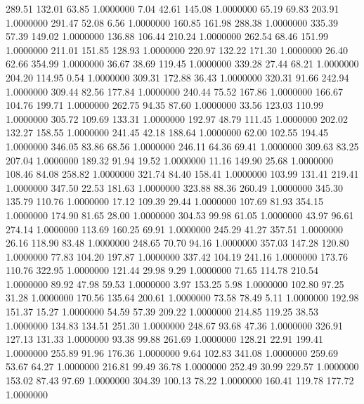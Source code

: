  289.51  132.01   63.85   1.0000000
   7.04   42.61  145.08   1.0000000
  65.19   69.83  203.91   1.0000000
 291.47   52.08    6.56   1.0000000
 160.85  161.98  288.38   1.0000000
 335.39   57.39  149.02   1.0000000
 136.88  106.44  210.24   1.0000000
 262.54   68.46  151.99   1.0000000
 211.01  151.85  128.93   1.0000000
 220.97  132.22  171.30   1.0000000
  26.40   62.66  354.99   1.0000000
  36.67   38.69  119.45   1.0000000
 339.28   27.44   68.21   1.0000000
 204.20  114.95    0.54   1.0000000
 309.31  172.88   36.43   1.0000000
 320.31   91.66  242.94   1.0000000
 309.44   82.56  177.84   1.0000000
 240.44   75.52  167.86   1.0000000
 166.67  104.76  199.71   1.0000000
 262.75   94.35   87.60   1.0000000
  33.56  123.03  110.99   1.0000000
 305.72  109.69  133.31   1.0000000
 192.97   48.79  111.45   1.0000000
 202.02  132.27  158.55   1.0000000
 241.45   42.18  188.64   1.0000000
  62.00  102.55  194.45   1.0000000
 346.05   83.86   68.56   1.0000000
 246.11   64.36   69.41   1.0000000
 309.63   83.25  207.04   1.0000000
 189.32   91.94   19.52   1.0000000
  11.16  149.90   25.68   1.0000000
 108.46   84.08  258.82   1.0000000
 321.74   84.40  158.41   1.0000000
 103.99  131.41  219.41   1.0000000
 347.50   22.53  181.63   1.0000000
 323.88   88.36  260.49   1.0000000
 345.30  135.79  110.76   1.0000000
  17.12  109.39   29.44   1.0000000
 107.69   81.93  354.15   1.0000000
 174.90   81.65   28.00   1.0000000
 304.53   99.98   61.05   1.0000000
  43.97   96.61  274.14   1.0000000
 113.69  160.25   69.91   1.0000000
 245.29   41.27  357.51   1.0000000
  26.16  118.90   83.48   1.0000000
 248.65   70.70   94.16   1.0000000
 357.03  147.28  120.80   1.0000000
  77.83  104.20  197.87   1.0000000
 337.42  104.19  241.16   1.0000000
 173.76  110.76  322.95   1.0000000
 121.44   29.98    9.29   1.0000000
  71.65  114.78  210.54   1.0000000
  89.92   47.98   59.53   1.0000000
   3.97  153.25    5.98   1.0000000
 102.80   97.25   31.28   1.0000000
 170.56  135.64  200.61   1.0000000
  73.58   78.49    5.11   1.0000000
 192.98  151.37   15.27   1.0000000
  54.59   57.39  209.22   1.0000000
 214.85  119.25   38.53   1.0000000
 134.83  134.51  251.30   1.0000000
 248.67   93.68   47.36   1.0000000
 326.91  127.13  131.33   1.0000000
  93.38   99.88  261.69   1.0000000
 128.21   22.91  199.41   1.0000000
 255.89   91.96  176.36   1.0000000
   9.64  102.83  341.08   1.0000000
 259.69   53.67   64.27   1.0000000
 216.81   99.49   36.78   1.0000000
 252.49   30.99  229.57   1.0000000
 153.02   87.43   97.69   1.0000000
 304.39  100.13   78.22   1.0000000
 160.41  119.78  177.72   1.0000000

